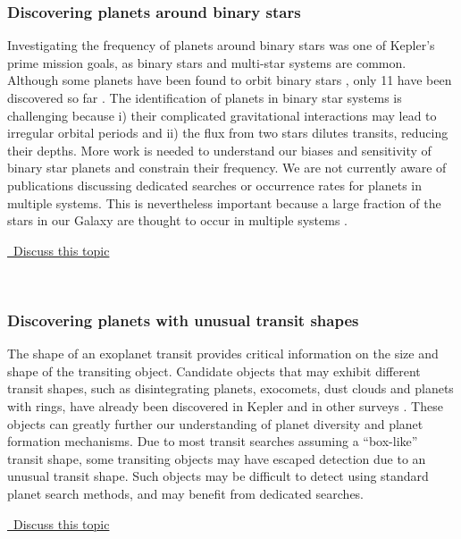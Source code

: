 \documentclass[modern]{aastex62}
\newcommand{\commentlink}[1]{\href{https://github.com/KeplerGO/ScientificOpportunities/issues/#1}{\sc \faExternalLink\ Discuss this topic}\,\,}
\begin{document}
\subsubsection{Discovering planets around binary stars}
Investigating the frequency of planets around binary stars was one of Kepler's prime mission goals, as binary stars and multi-star systems are common.  Although some planets have been found to orbit binary stars \cite[e.g. Kepler-16b,][]{doyle2011}, only 11 have been discovered so far \citep{fleming2018}.
The identification of planets in binary star systems is challenging because i) their complicated gravitational interactions may lead to irregular orbital periods and ii) the flux from two stars dilutes transits, reducing their depths. More work is needed to understand our biases and sensitivity of binary star planets and constrain their frequency.
We are not currently aware of publications discussing dedicated searches or occurrence rates for planets in multiple systems. This is nevertheless important because a large fraction of the stars in our Galaxy are thought to occur in multiple systems \citep{duchene2013}. 
 \\
\begin{center}
\commentlink{5}
\end{center}
\ \\

\subsubsection{Discovering planets with unusual transit shapes} 
The shape of an exoplanet transit provides critical information on the size and shape of the transiting object. Candidate objects that may exhibit different transit shapes, such as disintegrating planets, exocomets, dust clouds and planets with rings, have already been discovered in Kepler \citep[e.g.][]{vanderburg2015, tabby2016, rappaport2018} and in other surveys \citep[e.g.][]{mamajek2012}. These objects can greatly further our understanding of planet diversity and planet formation mechanisms. Due to most transit searches assuming a ``box-like'' transit shape, some transiting objects may have escaped detection due to an unusual transit shape. Such objects may be difficult to detect using standard planet search methods, and may benefit from dedicated searches.
\\
\begin{center}
\commentlink{6}
\end{center}
\ \\
\end{document}
